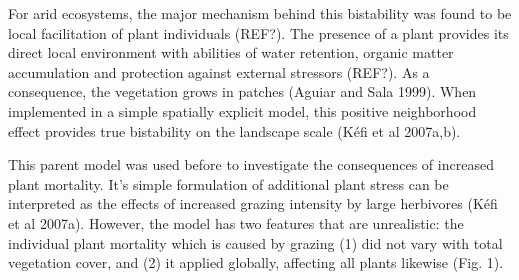 For arid ecosystems, the major mechanism behind this bistability was found to be local facilitation of plant individuals (REF?). The presence of a plant provides its direct local environment with abilities of water retention, organic matter accumulation and protection against external stressors (REF?). As a consequence, the vegetation grows in patches (Aguiar and Sala 1999).  When implemented in a simple spatially explicit model, this positive neighborhood effect provides true bistability on the landscape scale (K\'efi et al 2007a,b).

This parent model was used before to investigate the consequences of increased plant mortality. It's simple formulation of additional plant stress can be interpreted as the effects of increased grazing intensity by large herbivores (K\'efi et al 2007a). However, the model has two features that are unrealistic: the individual plant mortality which is caused by grazing (1) did not vary with total vegetation cover, and (2) it applied globally, affecting all plants likewise (Fig. 1).


